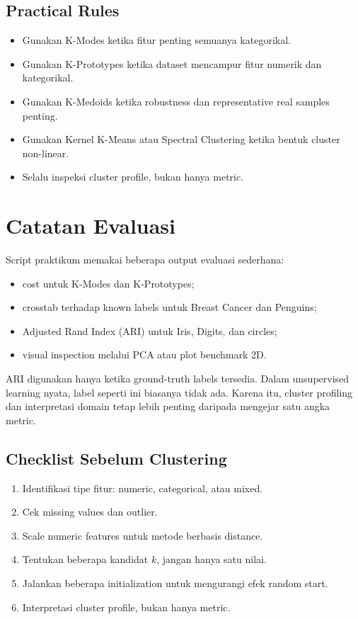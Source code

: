 \documentclass{article}
\begin{document}
\subsection*{Practical Rules}

\begin{itemize}[leftmargin=*]
    \item Gunakan K-Modes ketika fitur penting semuanya kategorikal.
    \item Gunakan K-Prototypes ketika dataset mencampur fitur numerik dan kategorikal.
    \item Gunakan K-Medoids ketika robustness dan representative real samples penting.
    \item Gunakan Kernel K-Means atau Spectral Clustering ketika bentuk cluster non-linear.
    \item Selalu inspeksi cluster profile, bukan hanya metric.
\end{itemize}

\section{Catatan Evaluasi}

Script praktikum memakai beberapa output evaluasi sederhana:

\begin{itemize}[leftmargin=*]
    \item cost untuk K-Modes dan K-Prototypes;
    \item crosstab terhadap known labels untuk Breast Cancer dan Penguins;
    \item Adjusted Rand Index (ARI) untuk Iris, Digits, dan circles;
    \item visual inspection melalui PCA atau plot benchmark 2D.
\end{itemize}

ARI digunakan hanya ketika ground-truth labels tersedia. Dalam unsupervised learning nyata, label seperti ini biasanya tidak ada. Karena itu, cluster profiling dan interpretasi domain tetap lebih penting daripada mengejar satu angka metric.
\subsection*{Checklist Sebelum Clustering}
\begin{enumerate}[leftmargin=*]
    \item Identifikasi tipe fitur: numeric, categorical, atau mixed.
    \item Cek missing values dan outlier.
    \item Scale numeric features untuk metode berbasis distance.
    \item Tentukan beberapa kandidat $k$, jangan hanya satu nilai.
    \item Jalankan beberapa initialization untuk mengurangi efek random start.
    \item Interpretasi cluster profile, bukan hanya metric.
\end{enumerate}
\end{document}
